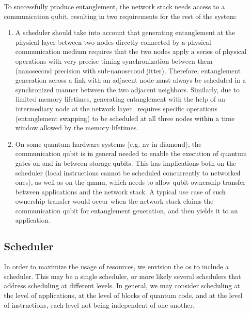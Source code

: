 To successfully produce entanglement, the network stack needs access to a communication qubit,
resulting in two requirements for the rest of the system:

\begin{enumerate}
    \item A scheduler should take into account that generating entanglement at the physical layer
          between two nodes directly connected by a physical communication medium requires that the
          two nodes apply a series of physical operations with very precise timing synchronization
          between them (nanosecond precision with sub-nanosecond jitter). Therefore, entanglement
          generation across a link with an adjacent node must always be scheduled in a synchronized
          manner between the two adjacent neighbors. Similarly, due to limited memory lifetimes,
          generating entanglement with the help of an intermediary node at the network
          layer~\cite{kozlowski_2020_qnp} requires specific operations (entanglement swapping) to be
          scheduled at all three nodes within a time window allowed by the memory lifetimes.
    \item On some quantum hardware systems (e.g. \acrshort{nv} in diamond), the communication qubit
          is in general needed to enable the execution of quantum gates on and in-between storage
          qubits. This has implications both on the scheduler (local instructions cannot be
          scheduled concurrently to networked ones), as well as on the \acrshort{qmmu}, which needs
          to allow qubit ownership transfer between applications and the network stack. A typical
          use case of such ownership transfer would occur when the network stack claims the
          communication qubit for entanglement generation, and then yields it to an application.
\end{enumerate}

\subsection{Scheduler}

In order to maximize the usage of resources, we envision the \acrshort{os} to include a scheduler.
This may be a single scheduler, or more likely several schedulers that address scheduling at
different levels. In general, we may consider scheduling at the level of applications, at the level
of blocks of quantum code, and at the level of instructions, each level not being independent of one
another.

